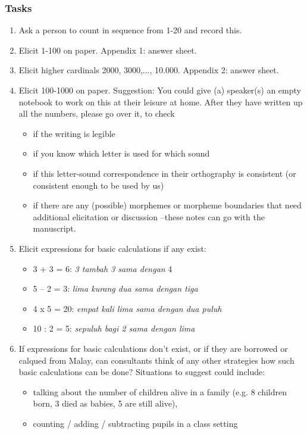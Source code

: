 \documentclass[output=paper]{LSP/langsci}
\begin{document}
\subsubsection*{Tasks}
\begin{enumerate}
\item Ask a person to count in sequence from 1-20 and record this.
\item Elicit 1-100 on paper. Appendix 1: answer sheet.
\item Elicit higher cardinals 2000, 3000,..., 10.000. Appendix 2: answer sheet. 
\item Elicit 100-1000 on paper. Suggestion: You could give (a) speaker(s) an empty  notebook to work on this at their leisure at home. After they have written up all the numbers, please go over it, to check   
  \begin{itemize}
  \item if the writing is legible 
  \item if you know which letter is used for which sound
  \item if this letter-sound correspondence in their orthography is consistent (or consistent enough to be used by us) 
  \item if there are any (possible) morphemes or morpheme boundaries that need additional elicitation or discussion --these notes can go with the manuscript.
  \end{itemize}
\item Elicit expressions for basic calculations if any exist: 
  \begin{itemize}
  \item 3 + 3 = 6: \textit{3 tambah 3 sama dengan} 4
  \item 5 -- 2 = 3: \textit{lima kurang dua sama dengan tiga}
  \item 4 x 5 = 20: \textit{empat kali lima sama dengan dua puluh}
  \item 10 : 2 = 5: \textit{sepuluh bagi 2 sama dengan lima} 
  \end{itemize}
\item If expressions for basic calculations don't exist, or if they are borrowed or calqued from Malay, can consultants think of any other strategies how such basic calculations can be done? Situations to suggest could include: 
  \begin{itemize}
  \item talking about the number of children alive in a family (e.g. 8 children born, 3 died as babies, 5 are still alive), 
  \item counting / adding / subtracting pupils in a class setting

\end{itemize}
\end{enumerate}
\end{document}
